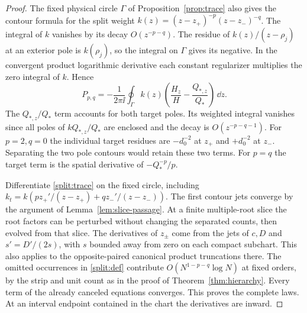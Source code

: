 \begin{proof}
The fixed physical circle \(\Gamma\) of Proposition~\ref{prop:trace}
also gives the contour formula for the split weight
\(k(z)=(z-z_+)^{-p}(z-z_-)^{-q}\).
The integral of \(k\) vanishes by its decay \(O(z^{-p-q})\).
The residue of \(k(z)/(z-\rho_j)\) at an exterior pole is
\(k(\rho_j)\), so the integral on \(\Gamma\) gives its negative.
In the convergent product logarithmic derivative each constant
regularizer multiplies the zero integral of \(k\). Hence
\begin{equation}
 P_{p,q}=-\frac1{2\pi\ii}\oint_\Gamma
                  k(z)\left(\frac{H_z}{H}-\frac{Q_{*,z}}{Q_*}\right)
                   \,\dd z.
 \label{split:trace}
\end{equation}
The \(Q_{*,z}/Q_*\) term accounts for both target poles.
Its weighted integral vanishes since all poles of \(kQ_{*,z}/Q_*\)
are enclosed and the decay is \(O(z^{-p-q-1})\).
For \(p=2,q=0\) the individual target residues are
\(-d_0^{-2}\) at \(z_+\) and \(+d_0^{-2}\) at \(z_-\).
Separating the two pole contours would retain these two terms.
For \(p=q\) the target term is the spatial derivative of
\(-Q_*^{-p}/p\).

Differentiate \eqref{split:trace} on the fixed circle, including
\(k_t=k(p z_+'/(z-z_+)+q z_-'/ (z-z_-))\).
The first contour jets converge by the argument of
Lemma~\ref{lem:slice-passage}. At a finite multiple-root slice
the root factors can be perturbed without changing the separated
counts, then evolved from that slice. The derivatives of \(z_\pm\)
come from the jets of \(c,D\) and \(s'=D'/(2s)\), with \(s\) bounded
away from zero on each compact subchart. This also applies to
the opposite-paired canonical product truncations there.
The omitted occurrences in \eqref{split:def} contribute
\(O(N^{1-p-q}\log N)\) at fixed orders, by the strip and unit count
as in the proof of Theorem~\ref{thm:hierarchy}. Every term of the
already canceled equations converges. This proves the complete
laws. At an interval endpoint contained in the chart the derivatives
are inward.
\end{proof}

